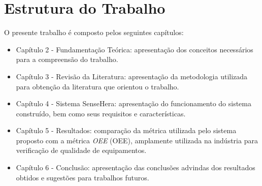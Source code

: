 \section{Estrutura do Trabalho}
O presente trabalho é composto pelos seguintes capítulos:
\begin{itemize}
  \item Capítulo 2 - Fundamentação Teórica: apresentação dos conceitos necessários para a compreensão do
  trabalho.
  \item Capítulo 3 - Revisão da Literatura: apresentação da metodologia utilizada para obtenção da literatura que orientou o trabalho.
  \item Capítulo 4 - Sistema SenseHera: apresentação do funcionamento do sistema construído, bem como seus requisitos e características.
  \item Capítulo 5 - Resultados: comparação da métrica utilizada pelo sistema proposto com a métrica \textit{\acrlong{OEE}} (\acrshort{OEE}), amplamente utilizada na indústria para verificação de qualidade de equipamentos.
  \item Capítulo 6 - Conclusão: apresentação das conclusões advindas dos resultados obtidos e
  sugestões para trabalhos futuros.
\end{itemize}
